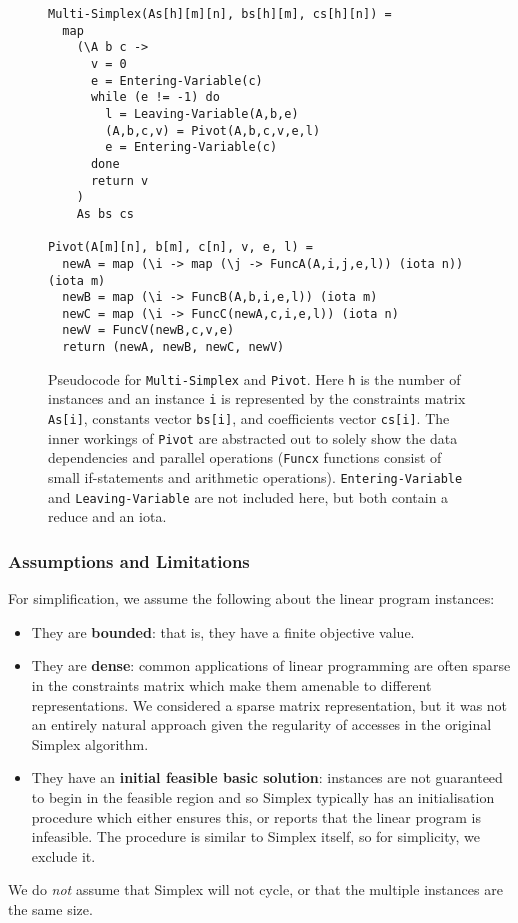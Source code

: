 \begin{figure}[H]
\begin{lstlisting}
Multi-Simplex(As[h][m][n], bs[h][m], cs[h][n]) =
  map
    (\A b c ->
      v = 0
      e = Entering-Variable(c)
      while (e != -1) do
        l = Leaving-Variable(A,b,e)
        (A,b,c,v) = Pivot(A,b,c,v,e,l)
        e = Entering-Variable(c)
      done
      return v
    )
    As bs cs

Pivot(A[m][n], b[m], c[n], v, e, l) =
  newA = map (\i -> map (\j -> FuncA(A,i,j,e,l)) (iota n)) (iota m)
  newB = map (\i -> FuncB(A,b,i,e,l)) (iota m)
  newC = map (\i -> FuncC(newA,c,i,e,l)) (iota n)
  newV = FuncV(newB,c,v,e)
  return (newA, newB, newC, newV)
\end{lstlisting}
\caption{Pseudocode for \texttt{Multi-Simplex} and \texttt{Pivot}. Here \texttt{h} is the number of instances and an instance \texttt{i} is represented by the constraints matrix \texttt{As[i]}, constants vector \texttt{bs[i]}, and coefficients vector \texttt{cs[i]}.\newline
The inner workings of \texttt{Pivot} are abstracted out to solely show the data dependencies and parallel operations (\texttt{Funcx} functions consist of small if-statements and arithmetic operations). \texttt{Entering-Variable} and \texttt{Leaving-Variable} are not included here, but both contain a reduce and an iota.}
\label{code:multi-simplex}
\end{figure}

\subsubsection{Assumptions and Limitations}
For simplification, we assume the following about the linear program instances:
\begin{itemize}
\item They are \textbf{bounded}: that is, they have a finite objective value.
\item They are \textbf{dense}: common applications of linear programming are often sparse in the constraints matrix which make them amenable to different representations. We considered a sparse matrix representation, but it was not an entirely natural approach given the regularity of accesses in the original Simplex algorithm.
\item They have an \textbf{initial feasible basic solution}: instances are not guaranteed to begin in the feasible region and so Simplex typically has an initialisation procedure which either ensures this, or reports that the linear program is infeasible. The procedure is similar to Simplex itself, so for simplicity, we exclude it.
\end{itemize}
We do \textit{not} assume that Simplex will not cycle, or that the multiple instances are the same size.

